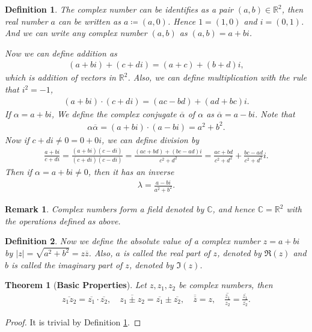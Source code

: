 \documentclass[11pt]{book}
\newtheorem{definition}{Definition}[chapter]
\newtheorem{theorem}{Theorem}[chapter]
\newtheorem{remark}{Remark}[chapter]
\theoremstyle{definition}
\numberwithin{equation}{chapter}
\begin{document}
\begin{definition}\label{def_71}
The complex number can be identifies as a pair $(a,b) \in \mathbb{R}^2$, then real number $a$ can be written as $a \coloneqq (a,0)$. Hence $1 = (1,0)$ and $i = (0,1)$. And we can write any complex number $(a,b)$ as $(a,b) = a + bi$.

Now we can define addition as
\begin{align*}
    (a + bi) + (c + di) = (a + c) + (b + d)i,
\end{align*}
which is addition of vectors in $\mathbb{R}^2$. Also, we can define multiplication with the rule that $i^2 = -1$, 
\begin{align*}
    (a + bi) \cdot (c + di) = (ac - bd) + (ad + bc)i.
\end{align*}
If $\alpha = a + bi$, We define the complex conjugate $\overline{\alpha}$ of $\alpha$ as $\overline{\alpha} = a - bi$. Note that
\begin{align*}
    \alpha \overline{\alpha} = (a + bi) \cdot (a - bi) = a^2 + b^2.
\end{align*}
Now if $c + di \neq 0 = 0 + 0i$, we can define division by
\begin{align*}
    \frac{a + bi}{c + di} = \frac{(a + bi) (c - di)}{(c + di) (c - di)} = \frac{(ac + bd) + (bc - ad)i}{c^2 + d^2} = \frac{ac + bd}{c^2 + d^2} + \frac{bc - ad}{c^2 + d^2}i.
\end{align*}
Then if $\alpha = a + bi \neq 0$, then it has an inverse 
\begin{align*}
    \lambda = \frac{a - bi}{a^2 + b^2}.
\end{align*}
\end{definition}

\begin{remark}
Complex numbers form a field denoted by $\mathbb{C}$, and hence $\mathbb{C} = \mathbb{R}^2$ with the operations defined as above.
\end{remark}


\medskip

\begin{definition}
Now we define the absolute value of a complex number $z = a + bi$ by $\left|z\right| = \sqrt{a^2 + b^2} = z \overline{z}$. Also, $a$ is called the real part of $z$, denoted by $\Re(z)$ and $b$ is called the imaginary part of $z$, denoted by $\Im(z)$.
\end{definition}

\medskip

\begin{theorem}[{\bf Basic Properties}]
Let $z, z_1, z_2$ be complex numbers, then
\begin{align*}
    \overline{z_1 z_2} = \overline{z_1} \cdot \overline{z_2}, \quad \overline{z_1 \pm z_2} = \overline{z_1} \pm \overline{z_2}, \quad \overline{\overline{z}} = z, \quad \overline{\frac{z_1}{z_2}} = \frac{\overline{z_1}}{\overline{z_2}}.
\end{align*}
\end{theorem}
\begin{proof}
It is trivial by Definition \ref{def_71}.
\end{proof}
\end{document}
